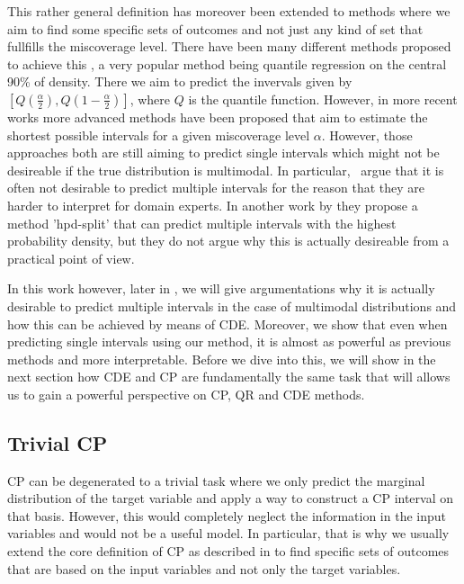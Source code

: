 This rather general definition has moreover been extended to methods where we aim to find some specific sets of outcomes and not just any kind of set that fullfills the miscoverage level. There have been many different methods proposed to achieve this \cite{sesia2021conformal, chernozhukov2021distributional, balasubramanian2014conformal, shafer2008tutorial}, a very popular method being quantile regression on the central 90\% of density. There we aim to predict the invervals given by $[Q(\frac{\alpha}{2}), Q(1-\frac{\alpha}{2})]$, where $Q$ is the quantile function. However, in more recent works \cite{sesia2021conformal, chernozhukov2021distributional} more advanced methods have been proposed that aim to estimate the shortest possible intervals for a given miscoverage level $\alpha$. However, those approaches both are still aiming to predict single intervals which might not be desireable if the true distribution is multimodal. In particular,~\cite{sesia2021conformal} argue that it is often not desirable to predict multiple intervals for the reason that they are harder to interpret for domain experts. In another work by \cite{izbicki2022cd} they propose a method 'hpd-split' that can predict multiple intervals with the highest probability density, but they do not argue why this is actually desireable from a practical point of view.

In this work however, later in , we will give argumentations why it is actually desirable to predict multiple intervals in the case of multimodal distributions and how this can be achieved by means of CDE. Moreover, we show that even when predicting single intervals using our method, it is almost as powerful as previous methods and more interpretable. Before we dive into this, we will show in the next section how CDE and CP are fundamentally the same task that will allows us to gain a powerful perspective on CP, QR and CDE methods.

\subsection{Trivial CP}\label{sec:trivial_cp}

CP can be degenerated to a trivial task where we only predict the marginal distribution of the target variable and apply a way to construct a CP interval on that basis. However, this would completely neglect the information in the input variables and would not be a useful model. In particular, that is why we usually extend the core definition of CP as described in  to find specific sets of outcomes that are based on the input variables and not only the target variables.

